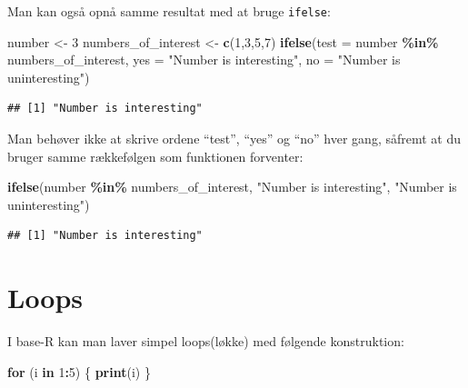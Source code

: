 \documentclass[
]{book}
\newenvironment{Shaded}{\begin{snugshade}}{\end{snugshade}}
\newcommand{\AttributeTok}[1]{\textcolor[rgb]{0.13,0.29,0.53}{#1}}
\newcommand{\ControlFlowTok}[1]{\textcolor[rgb]{0.13,0.29,0.53}{\textbf{#1}}}
\newcommand{\DecValTok}[1]{\textcolor[rgb]{0.00,0.00,0.81}{#1}}
\newcommand{\FunctionTok}[1]{\textcolor[rgb]{0.13,0.29,0.53}{\textbf{#1}}}
\newcommand{\NormalTok}[1]{#1}
\newcommand{\OtherTok}[1]{\textcolor[rgb]{0.56,0.35,0.01}{#1}}
\newcommand{\SpecialCharTok}[1]{\textcolor[rgb]{0.81,0.36,0.00}{\textbf{#1}}}
\newcommand{\StringTok}[1]{\textcolor[rgb]{0.31,0.60,0.02}{#1}}
\begin{document}
Man kan også opnå samme resultat med at bruge \texttt{ifelse}:

\begin{Shaded}
\begin{Highlighting}[]
\NormalTok{number }\OtherTok{\textless{}{-}} \DecValTok{3}
\NormalTok{numbers\_of\_interest }\OtherTok{\textless{}{-}} \FunctionTok{c}\NormalTok{(}\DecValTok{1}\NormalTok{,}\DecValTok{3}\NormalTok{,}\DecValTok{5}\NormalTok{,}\DecValTok{7}\NormalTok{)}
\FunctionTok{ifelse}\NormalTok{(}\AttributeTok{test =}\NormalTok{ number }\SpecialCharTok{\%in\%}\NormalTok{ numbers\_of\_interest, }
       \AttributeTok{yes =} \StringTok{"Number is interesting"}\NormalTok{,}
       \AttributeTok{no =}  \StringTok{"Number is uninteresting"}\NormalTok{)}
\end{Highlighting}
\end{Shaded}

\begin{verbatim}
## [1] "Number is interesting"
\end{verbatim}

Man behøver ikke at skrive ordene ``test'', ``yes'' og ``no'' hver gang, såfremt at du bruger samme rækkefølgen som funktionen forventer:

\begin{Shaded}
\begin{Highlighting}[]
\FunctionTok{ifelse}\NormalTok{(number }\SpecialCharTok{\%in\%}\NormalTok{ numbers\_of\_interest, }
       \StringTok{"Number is interesting"}\NormalTok{,}
       \StringTok{"Number is uninteresting"}\NormalTok{)}
\end{Highlighting}
\end{Shaded}

\begin{verbatim}
## [1] "Number is interesting"
\end{verbatim}

\section{Loops}\label{loops}

I base-R kan man laver simpel loops(løkke) med følgende konstruktion:

\begin{Shaded}
\begin{Highlighting}[]
\ControlFlowTok{for}\NormalTok{ (i }\ControlFlowTok{in} \DecValTok{1}\SpecialCharTok{:}\DecValTok{5}\NormalTok{) \{}
  \FunctionTok{print}\NormalTok{(i)}
\NormalTok{\}}
\end{Highlighting}
\end{Shaded}
\end{document}
